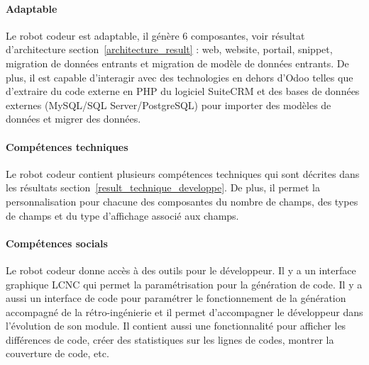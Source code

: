 
\paragraph{Adaptable}
Le robot codeur est adaptable, il génère 6 composantes, voir résultat d'architecture section~\ref{architecture_result} : web, website, portail, snippet, migration de données entrants et migration de modèle de données entrants. De plus, il est capable d'interagir avec des technologies en dehors d'Odoo telles que d'extraire du code externe en PHP du logiciel SuiteCRM et des bases de données externes (MySQL/SQL Server/PostgreSQL) pour importer des modèles de données et migrer des données.


\paragraph{Compétences techniques}
Le robot codeur contient plusieurs compétences techniques qui sont décrites dans les résultats section~\ref{result_technique_developpe}. De plus, il permet la personnalisation pour chacune des composantes du nombre de champs, des types de champs et du type d'affichage associé aux champs.


\paragraph{Compétences socials}
Le robot codeur donne accès à des outils pour le développeur. Il y a un interface graphique LCNC qui permet la paramétrisation pour la génération de code. Il y a aussi un interface de code pour paramétrer le fonctionnement de la génération accompagné de la rétro-ingénierie et il permet d'accompagner le développeur dans l'évolution de son module. Il contient aussi une fonctionnalité pour afficher les différences de code, créer des statistiques sur les lignes de codes, montrer la couverture de code, etc.

